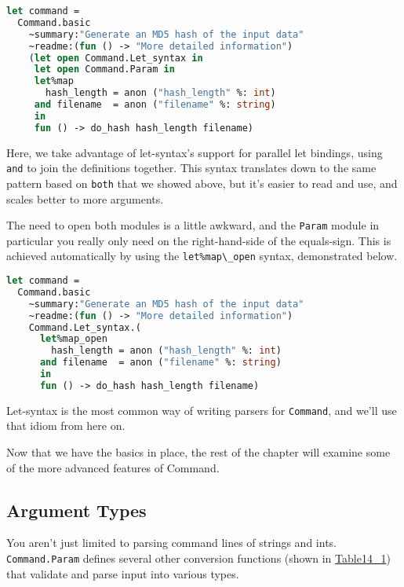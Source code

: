 \begin{lstlisting}[language=Caml]
let command =
  Command.basic
    ~summary:"Generate an MD5 hash of the input data"
    ~readme:(fun () -> "More detailed information")
    (let open Command.Let_syntax in
     let open Command.Param in
     let%map
       hash_length = anon ("hash_length" %: int)
     and filename  = anon ("filename" %: string)
     in
     fun () -> do_hash hash_length filename)
\end{lstlisting}

Here, we take advantage of let-syntax's support for parallel let
bindings, using \passthrough{\lstinline!and!} to join the definitions
together. This syntax translates down to the same pattern based on
\passthrough{\lstinline!both!} that we showed above, but it's easier to
read and use, and scales better to more arguments.

The need to open both modules is a little awkward, and the
\passthrough{\lstinline!Param!} module in particular you really only
need on the right-hand-side of the equals-sign. This is achieved
automatically by using the \passthrough{\lstinline!let\%map\_open!}
syntax, demonstrated below.

\begin{lstlisting}[language=Caml]
let command =
  Command.basic
    ~summary:"Generate an MD5 hash of the input data"
    ~readme:(fun () -> "More detailed information")
    Command.Let_syntax.(
      let%map_open
        hash_length = anon ("hash_length" %: int)
      and filename  = anon ("filename" %: string)
      in
      fun () -> do_hash hash_length filename)
\end{lstlisting}

Let-syntax is the most common way of writing parsers for
\passthrough{\lstinline!Command!}, and we'll use that idiom from here
on.

Now that we have the basics in place, the rest of the chapter will
examine some of the more advanced features of Command.

\hypertarget{argument-types}{%
\subsection{Argument Types}\label{argument-types}}

You aren't just limited to parsing command lines of strings and ints.
\passthrough{\lstinline!Command.Param!} defines several other conversion
functions (shown in
\href{command-line-parsing.html\#table14_1}{Table14\_1}) that validate
and parse input into various types. 


